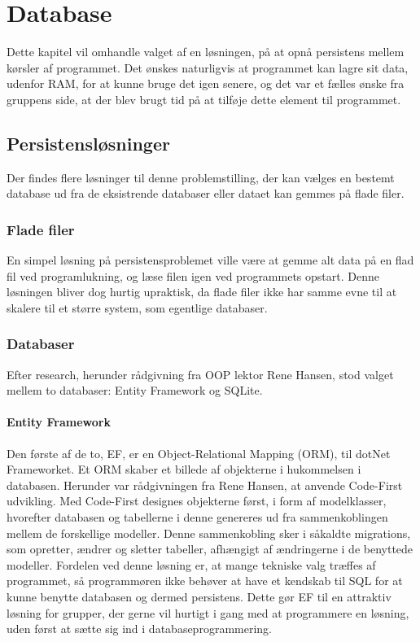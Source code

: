 \chapter{Database}\label{chap:database}

Dette kapitel vil omhandle valget af en løsningen, på at opnå persistens mellem kørsler af programmet.
Det ønskes naturligvis at programmet kan lagre sit data, udenfor RAM, for at kunne bruge det igen senere, og det var et fælles ønske fra gruppens side, at der blev brugt tid på at tilføje dette element til programmet.

\section{Persistensløsninger}

Der findes flere løsninger til denne problemstilling, der kan vælges en bestemt database ud fra de eksistrende databaser eller dataet kan gemmes på flade filer.

\subsection{Flade filer}
En simpel løsning på persistensproblemet ville være at gemme alt data på en flad fil ved programlukning, og læse filen igen ved programmets opstart.
Denne løsningen bliver dog hurtig upraktisk, da flade filer ikke har samme evne til at skalere til et større system, som egentlige databaser.

\subsection{Databaser}
Efter research, herunder rådgivning fra OOP lektor Rene Hansen, stod valget mellem to databaser: Entity Framework og SQLite.

\subsubsection*{Entity Framework}
Den første af de to, \ac{EF}, er en Object-Relational Mapping (ORM), til dotNet Frameworket.
Et ORM skaber et billede af objekterne i hukommelsen i databasen. 
Herunder var rådgivningen fra Rene Hansen, at anvende Code-First udvikling.
Med Code-First designes objekterne først, i form af modelklasser, hvorefter databasen og tabellerne i denne genereres ud fra sammenkoblingen mellem de forskellige modeller. Denne sammenkobling sker i såkaldte migrations, som opretter, ændrer og sletter tabeller, afhængigt af ændringerne i de benyttede modeller.
Fordelen ved denne løsning er, at mange tekniske valg træffes af programmet, så programmøren ikke behøver at have et kendskab til \ac{SQL} for at kunne benytte databasen og dermed persistens.
Dette gør \ac{EF} til en attraktiv løsning for grupper, der gerne vil hurtigt i gang med at programmere en løsning, uden først at sætte sig ind i databaseprogrammering.

